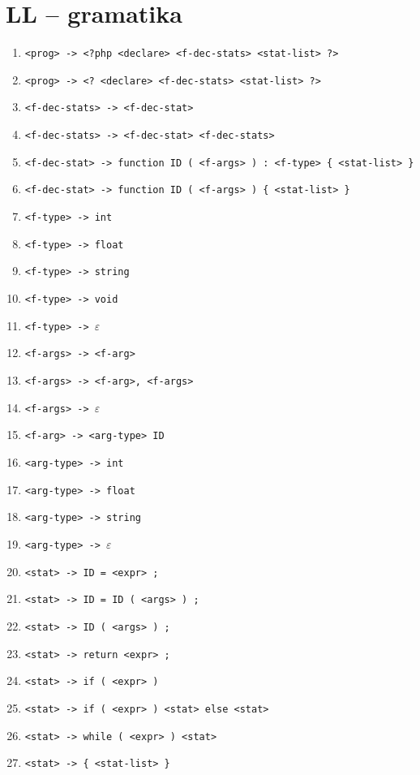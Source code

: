 \documentclass[a4paper, 11pt]{article}
\begin{document}
    \newpage
	\section{LL -- gramatika}
	    \begin{table}[!ht]
		\centering
		\begin{enumerate}[noitemsep]
			\item \verb|<prog> -> <?php <declare> <f-dec-stats> <stat-list> ?>|
			\item \verb|<prog> -> <? <declare> <f-dec-stats> <stat-list> ?>|

			\item \verb|<f-dec-stats> -> <f-dec-stat>|
			\item \verb|<f-dec-stats> -> <f-dec-stat> <f-dec-stats>|

			\item \verb|<f-dec-stat> -> function ID ( <f-args> ) : <f-type> { <stat-list> }|
			\item \verb|<f-dec-stat> -> function ID ( <f-args> ) { <stat-list> }|

			\item \verb|<f-type> -> int|
			\item \verb|<f-type> -> float|
			\item \verb|<f-type> -> string|
			\item \verb|<f-type> -> void|
            \item \verb|<f-type> -> |$\varepsilon$

			\item \verb|<f-args> -> <f-arg>|
			\item \verb|<f-args> -> <f-arg>, <f-args>|
			\item \verb|<f-args> -> |$\varepsilon$

			\item \verb|<f-arg> -> <arg-type> ID|

            \item \verb|<arg-type> -> int|
            \item \verb|<arg-type> -> float|
            \item \verb|<arg-type> -> string|
            \item \verb|<arg-type> -> |$\varepsilon$

			\item \verb|<stat> -> ID = <expr> ;|
			\item \verb|<stat> -> ID = ID ( <args> ) ;|
			\item \verb|<stat> -> ID ( <args> ) ;|
			\item \verb|<stat> -> return <expr> ;|
			\item \verb|<stat> -> if ( <expr> )|
			\item \verb|<stat> -> if ( <expr> ) <stat> else <stat>|
			\item \verb|<stat> -> while ( <expr> ) <stat>|
			\item \verb|<stat> -> { <stat-list> }|


\end{enumerate}
\end{table}
\end{document}

